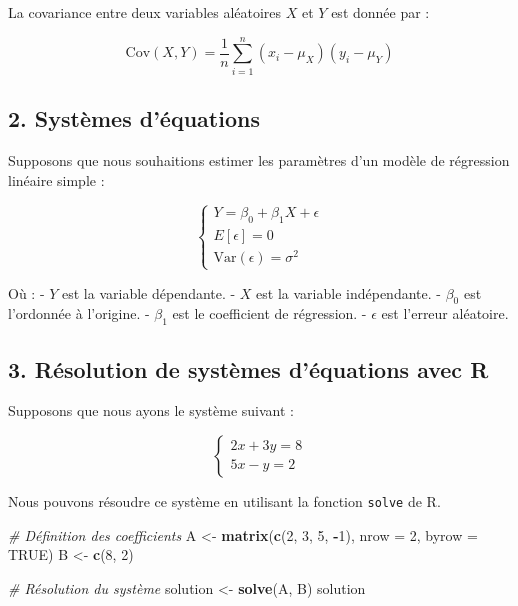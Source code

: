 \documentclass[
]{article}
\newenvironment{Shaded}{\begin{snugshade}}{\end{snugshade}}
\newcommand{\AttributeTok}[1]{\textcolor[rgb]{0.13,0.29,0.53}{#1}}
\newcommand{\CommentTok}[1]{\textcolor[rgb]{0.56,0.35,0.01}{\textit{#1}}}
\newcommand{\ConstantTok}[1]{\textcolor[rgb]{0.56,0.35,0.01}{#1}}
\newcommand{\DecValTok}[1]{\textcolor[rgb]{0.00,0.00,0.81}{#1}}
\newcommand{\FunctionTok}[1]{\textcolor[rgb]{0.13,0.29,0.53}{\textbf{#1}}}
\newcommand{\NormalTok}[1]{#1}
\newcommand{\OtherTok}[1]{\textcolor[rgb]{0.56,0.35,0.01}{#1}}
\newcommand{\SpecialCharTok}[1]{\textcolor[rgb]{0.81,0.36,0.00}{\textbf{#1}}}
\begin{document}
La covariance entre deux variables aléatoires \(X\) et \(Y\) est donnée
par :

\[
\text{Cov}(X, Y) = \frac{1}{n} \sum_{i=1}^{n} (x_i - \mu_X)(y_i - \mu_Y)
\]

\hypertarget{systuxe8mes-duxe9quations}{%
\subsection{2. Systèmes d'équations}\label{systuxe8mes-duxe9quations}}

Supposons que nous souhaitions estimer les paramètres d'un modèle de
régression linéaire simple :

\[
\begin{cases}
Y = \beta_0 + \beta_1 X + \epsilon \\
E[\epsilon] = 0 \\
\text{Var}(\epsilon) = \sigma^2
\end{cases}
\]

Où : - \(Y\) est la variable dépendante. - \(X\) est la variable
indépendante. - \(\beta_0\) est l'ordonnée à l'origine. - \(\beta_1\)
est le coefficient de régression. - \(\epsilon\) est l'erreur aléatoire.

\hypertarget{ruxe9solution-de-systuxe8mes-duxe9quations-avec-r}{%
\subsection{3. Résolution de systèmes d'équations avec
R}\label{ruxe9solution-de-systuxe8mes-duxe9quations-avec-r}}

Supposons que nous ayons le système suivant :

\[
\begin{cases}
2x + 3y = 8 \\
5x - y = 2
\end{cases}
\]

Nous pouvons résoudre ce système en utilisant la fonction \texttt{solve}
de R.

\begin{Shaded}
\begin{Highlighting}[]
\CommentTok{\# Définition des coefficients}
\NormalTok{A }\OtherTok{\textless{}{-}} \FunctionTok{matrix}\NormalTok{(}\FunctionTok{c}\NormalTok{(}\DecValTok{2}\NormalTok{, }\DecValTok{3}\NormalTok{,}
              \DecValTok{5}\NormalTok{, }\SpecialCharTok{{-}}\DecValTok{1}\NormalTok{), }\AttributeTok{nrow =} \DecValTok{2}\NormalTok{, }\AttributeTok{byrow =} \ConstantTok{TRUE}\NormalTok{)}
\NormalTok{B }\OtherTok{\textless{}{-}} \FunctionTok{c}\NormalTok{(}\DecValTok{8}\NormalTok{, }\DecValTok{2}\NormalTok{)}

\CommentTok{\# Résolution du système}
\NormalTok{solution }\OtherTok{\textless{}{-}} \FunctionTok{solve}\NormalTok{(A, B)}
\NormalTok{solution}
\end{Highlighting}
\end{Shaded}
\end{document}
